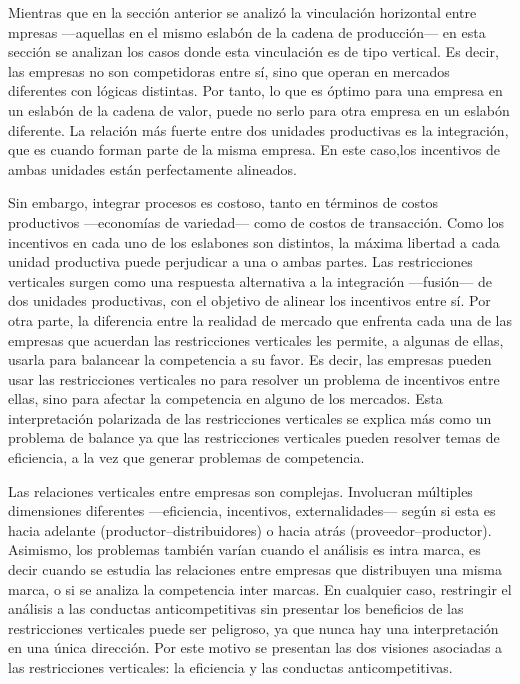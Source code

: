 \documentclass[
  12pt,
  spanish,
]{book}
\begin{document}
Mientras que en la sección anterior se analizó la vinculación horizontal entre mpresas ---aquellas en el mismo eslabón de la cadena de producción--- en esta sección se analizan los casos donde esta vinculación es de tipo vertical. Es decir, las empresas no son competidoras entre sí, sino que operan en mercados diferentes con lógicas distintas. Por tanto, lo que es óptimo para una empresa en un eslabón de la cadena de valor, puede no serlo para otra empresa en un eslabón diferente. La relación más fuerte entre dos unidades productivas es la integración, que es cuando forman parte de la misma empresa. En este caso,los incentivos de ambas unidades están perfectamente alineados.

Sin embargo, integrar procesos es costoso, tanto en términos de costos productivos ---economías de variedad--- como de costos de transacción. Como los incentivos en cada uno de los eslabones son distintos, la máxima libertad a cada unidad productiva puede perjudicar a una o ambas partes. Las restricciones verticales surgen como una respuesta alternativa a la integración ---fusión--- de dos unidades productivas, con el objetivo de alinear los incentivos entre sí. Por otra parte, la diferencia entre la realidad de mercado que enfrenta cada una de las empresas que acuerdan las restricciones verticales les permite, a algunas de ellas, usarla para balancear la competencia a su favor. Es decir, las empresas pueden usar las restricciones verticales no para resolver un problema de incentivos entre ellas, sino para afectar la competencia en alguno de los mercados. Esta interpretación polarizada de las restricciones verticales se explica más como un problema de balance ya que las restricciones verticales pueden resolver temas de eficiencia, a la vez que generar problemas de competencia.

Las relaciones verticales entre empresas son complejas. Involucran múltiples dimensiones diferentes ---eficiencia, incentivos, externalidades--- según si esta es hacia adelante (productor--distribuidores) o hacia atrás (proveedor--productor). Asimismo, los problemas también varían cuando el análisis es intra marca, es decir cuando se estudia las relaciones entre empresas que distribuyen una misma marca, o si se analiza la competencia inter marcas. En cualquier caso, restringir el análisis a las conductas anticompetitivas sin presentar los beneficios de las restricciones verticales puede ser peligroso, ya que nunca hay una interpretación en una única dirección. Por este motivo se presentan las dos visiones asociadas a las restricciones verticales: la eficiencia y las conductas anticompetitivas.
\end{document}
